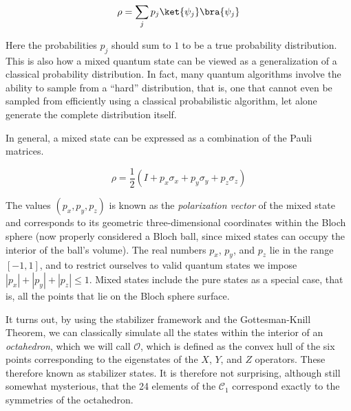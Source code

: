 \begin{equation}
\rho = \sum_{j} p_j \ket{\psi_j}\bra{\psi_j}
\end{equation}

Here the probabilities $p_j$ should sum to $1$ to be a true probability
distribution. This is also how a mixed quantum state can be viewed as a
generalization of a classical probability distribution. In fact, many
quantum algorithms involve the ability to sample from a ``hard'' distribution,
that is, one that cannot even be sampled from efficiently using a classical
probabilistic algorithm, let alone generate the complete distribution itself.

In general, a mixed state can be expressed as a combination of the Pauli
matrices.

\begin{equation}
\rho = \frac{1}{2}(I + p_x\sigma_x + p_y\sigma_y + p_z\sigma_z)
\end{equation}

The values $(p_x, p_y, p_z)$ is known as the \emph{polarization vector} of
the mixed state and corresponds to its geometric three-dimensional coordinates
within the Bloch sphere (now properly considered a Bloch ball, since mixed
states can occupy the interior of the ball's volume). The real numbers
$p_x$, $p_y$, and $p_z$ lie in the range $[-1,1]$, and to restrict ourselves
to valid quantum states we impose $|p_x| + |p_y| + |p_z| \le 1$.
Mixed states include the pure states as a special case, that is, all the
points that lie on the Bloch sphere surface.



It turns out, by using the stabilizer framework and the Gottesman-Knill Theorem,
we can classically simulate all the states within the interior of an
\emph{octahedron}, which we will call $\mathcal{O}$, which is defined as the
convex hull of the six points corresponding to the eigenstates of the
$X$, $Y$, and $Z$ operators.
These therefore known as stabilizer states.
It is therefore not surprising, although still somewhat
mysterious, that the 24 elements of the $\mathcal{C}_1$ correspond
exactly to the symmetries of the octahedron.

